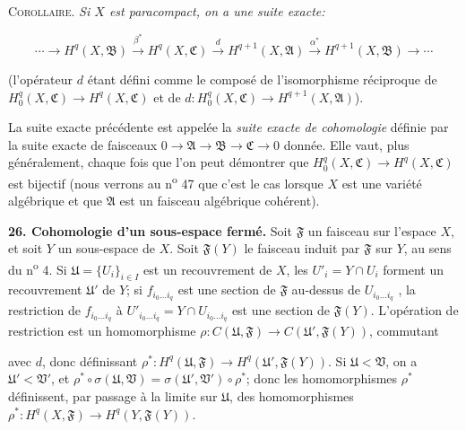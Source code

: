 \textsc{Corollaire}. \textit{Si $X$ est paracompact, on a une suite exacte:}

\begin{equation*}
\cdots \longrightarrow H^q(X, \mathfrak{B}) \overset{\beta^*}{\longrightarrow} H^q(X, \mathfrak{C}) \overset{d}{\longrightarrow} H^{q+1}(X, \mathfrak{A}) \overset{\alpha^*}{\longrightarrow} H^{q+1}(X, \mathfrak{B}) \longrightarrow \cdots
\end{equation*}

(l'opérateur $d$ étant défini comme le composé de l'isomorphisme réciproque de $H_0^q(X, \mathfrak{C}) \rightarrow H^q(X, \mathfrak{C})$ et de $d: H_0^q(X, \mathfrak{C}) \rightarrow H^{q+1}(X, \mathfrak{A})$).

La suite exacte précédente est appelée la \textit{suite exacte de cohomologie} définie par la suite exacte de faisceaux $0 \rightarrow \mathfrak{A} \rightarrow \mathfrak{B} \rightarrow \mathfrak{C} \rightarrow 0$ donnée. Elle vaut, plus généralement, chaque fois que l'on peut démontrer que $H_0^q(X, \mathfrak{C}) \rightarrow H^q(X, \mathfrak{C})$ est bijectif (nous verrons au n\textsuperscript{o} 47 que c'est le cas lorsque $X$ est une variété algébrique et que $\mathfrak{A}$ est un faisceau algébrique cohérent).

\textbf{26. Cohomologie d'un sous-espace fermé.} Soit $\mathfrak{F}$ un faisceau sur l'espace $X$, et soit $Y$ un sous-espace de $X$. Soit $\mathfrak{F}(Y)$ le faisceau induit par $\mathfrak{F}$ sur $Y$, au sens du n\textsuperscript{o} 4. Si $\mathfrak{U} = \{U_i\}_{i \in I}$ est un recouvrement de $X$, les $U'_i = Y \cap U_i$ forment un recouvrement $\mathfrak{U}'$ de $Y$; si $f_{i_0 \ldots i_q}$ est une section de $\mathfrak{F}$ au-dessus de $U_{i_0 \ldots i_q}$ , la restriction de $f_{i_0 \ldots i_q}$ à $U'_{i_0 \ldots i_q} = Y \cap U_{i_0 \ldots i_q}$ est une section de $\mathfrak{F}(Y)$. L'opération de restriction est un homomorphisme $\rho: C(\mathfrak{U}, \mathfrak{F}) \rightarrow C(\mathfrak{U}', \mathfrak{F}(Y))$, commutant



 avec $d$, donc définissant $\rho^*:H^q(\mathfrak{U}, \mathfrak{F}) \to H^q(\mathfrak{U}', \mathfrak{F}(Y))$. Si $\mathfrak{U} < \mathfrak{V}$, on a $\mathfrak{U}' < \mathfrak{V}'$, et $\rho^* \circ \sigma(\mathfrak{U}, \mathfrak{V}) = \sigma(\mathfrak{U}', \mathfrak{V}') \circ \rho^*$; donc les homomorphismes $\rho^*$ définissent, par passage à la limite sur $\mathfrak{U}$, des homomorphismes $\rho^*:H^q(X, \mathfrak{F}) \to H^q(Y, \mathfrak{F}(Y))$.

